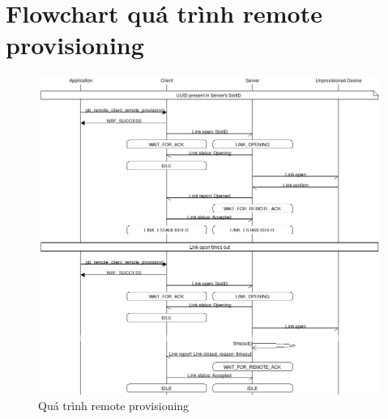 \chapter{Flowchart quá trình remote provisioning}\label{remoteprov}
    \begin{figure}[h!]
    	\begin{center}
    		\includegraphics[scale=0.4]{images/msc_pb_remote_link_open.png}
    		\caption{Quá trình remote provisioning}
    	\end{center}
    \end{figure}
    
